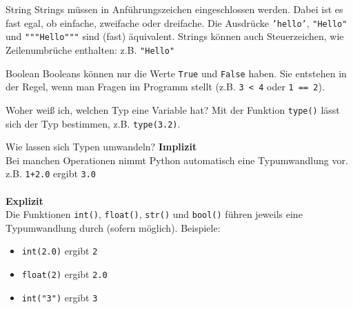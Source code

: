 \documentclass[algorithm,pgfplots,colortheme=dark]{cuzbeamer}
\newcommand{\py}[1]{\texttt{#1}}
\begin{document}
\begin{frame}
\begin{block}{String}
Strings müssen in Anführungszeichen eingeschlossen werden. Dabei ist es fast egal, ob einfache, zweifache oder dreifache. Die Ausdrücke \texttt{'hello'}, \texttt{"Hello"} und \texttt{"""Hello"""} sind (fast) äquivalent. Strings können auch Steuerzeichen, wie Zeilenumbrüche enthalten: z.B. \texttt{"Hello\n"} 
\end{block} 

\vspace{12pt}
\begin{block}{Boolean}
Booleans können nur die Werte \texttt{True} und \texttt{False} haben. Sie entstehen in der Regel, wenn man Fragen im Programm stellt (z.B. \py{3 < 4} oder \py{1 == 2}).   	
\end{block}
\end{frame}

\begin{frame}
\begin{block}{Woher weiß ich, welchen Typ eine Variable hat?}
	\vspace{2pt}
Mit der Funktion \py{type()} lässt sich der Typ bestimmen, z.B. \py{type(3.2)}.  	
\end{block}
\vspace{12pt}
\begin{block}{Wie lassen sich Typen umwandeln?}
	\vspace{2pt}
	\textbf{Implizit}\\
	Bei manchen Operationen nimmt Python automatisch eine Typumwandlung vor. z.B. \py{1+2.0} ergibt \py{3.0}	\\ \\
	\textbf{Explizit}\\
	Die Funktionen \py{int()}, \py{float()}, \py{str()} und \py{bool()} führen jeweils eine Typumwandlung durch (sofern möglich). Beispiele: 
	\begin{itemize}
		\item \py{int(2.0)} ergibt \py{2} 
		\item \py{float(2)} ergibt \py{2.0} 
		\item \py{int("3")} ergibt \py{3}
	\end{itemize} 
\end{block}


\end{frame}
\end{document}
